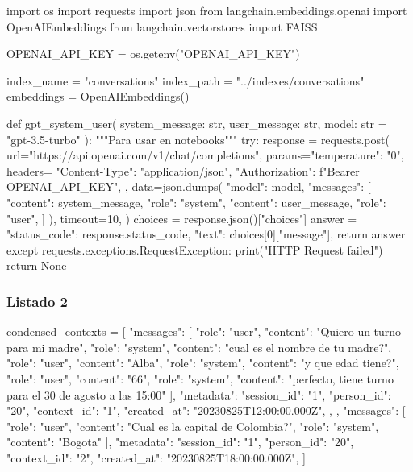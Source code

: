 \begin{APACode}
import os
import requests
import json
from langchain.embeddings.openai import OpenAIEmbeddings
from langchain.vectorstores import FAISS

OPENAI_API_KEY = os.getenv("OPENAI_API_KEY")

index_name = "conversations"
index_path = "../indexes/conversations"
embeddings = OpenAIEmbeddings()

def gpt_system_user(
    system_message: str, user_message: str, model: str = "gpt-3.5-turbo"
):
    """Para usar en notebooks"""
    try:
        response = requests.post(
            url="https://api.openai.com/v1/chat/completions",
            params={"temperature": "0"},
            headers={
                "Content-Type": "application/json",
                "Authorization": f"Bearer {OPENAI_API_KEY}",
            },
            data=json.dumps({
                "model": model,
                "messages": [
                    {"content": system_message, "role": "system"},
                    {"content": user_message, "role": "user"},
                ]
            }),
            timeout=10,
        )
        choices = response.json()["choices"]
        answer = {
            "status_code": response.status_code,
            "text": choices[0]["message"],
        }
        return answer
    except requests.exceptions.RequestException:
        print("HTTP Request failed")
        return None
\end{APACode}

\subsubsection{Listado 2}
\label{anexo:code-4-1-9-2}

\begin{APACode}
condensed_contexts = [
    {
        "messages": [
            {"role": "user", "content": "Quiero un turno para mi madre"},
            {"role": "system", "content": "cual es el nombre de tu madre?"},
            {"role": "user", "content": "Alba"},
            {"role": "system", "content": "y que edad tiene?"},
            {"role": "user", "content": "66"},
            {"role": "system", 
             "content": "perfecto, tiene turno para el 30 de agosto a las 15:00"}
        ],
        "metadata": {
            "session_id": "1",
            "person_id": "20",
            "context_id": "1",
            "created_at": "20230825T12:00:00.000Z",
        },
    },
    {
        "messages": [
            {"role": "user", "content": "Cual es la capital de Colombia?"},
            {"role": "system", "content": "Bogota"}
        ],
        "metadata": {
            "session_id": "1",
            "person_id": "20",
            "context_id": "2",
            "created_at": "20230825T18:00:00.000Z",
        }
    }
]
\end{APACode}

